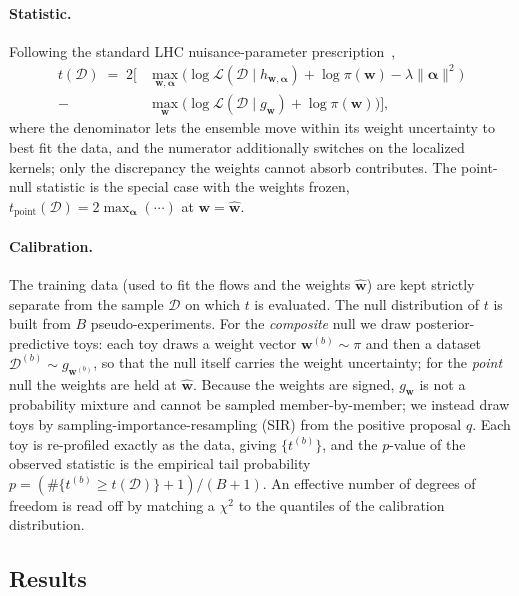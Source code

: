 \paragraph{Statistic.}
Following the standard LHC nuisance-parameter prescription~\citep{Cowan:2010js},
\begin{equation}\label{eq:app-lrt}
\begin{aligned}
  t(\mathcal D) \;=\; 2\Big[
    &\max_{\boldsymbol w,\boldsymbol\alpha}
      \Big(\log\mathcal L(\mathcal D\mid h_{\boldsymbol w,\boldsymbol\alpha})
           + \log\pi(\boldsymbol w) - \lambda\|\boldsymbol\alpha\|^2\Big) \\
    -\; &\max_{\boldsymbol w}
      \Big(\log\mathcal L(\mathcal D\mid g_{\boldsymbol w})
           + \log\pi(\boldsymbol w)\Big)
  \Big] ,
\end{aligned}
\end{equation}
where the denominator lets the ensemble move within its weight uncertainty to
best fit the data, and the numerator additionally switches on the localized
kernels; only the discrepancy the weights cannot absorb contributes. The
point-null statistic is the special case with the weights frozen,
$t_{\mathrm{point}}(\mathcal D)=2\max_{\boldsymbol\alpha}(\cdots)$ at
$\boldsymbol w=\hat{\boldsymbol w}$.

\paragraph{Calibration.}
The training data (used to fit the flows and the weights $\hat{\boldsymbol w}$)
are kept strictly separate from the sample $\mathcal D$ on which $t$ is evaluated.
The null distribution of $t$ is built from $B$ pseudo-experiments. For the
\emph{composite} null we draw posterior-predictive toys: each toy draws a weight
vector $\boldsymbol w^{(b)}\sim\pi$ and then a dataset
$\mathcal D^{(b)}\sim g_{\boldsymbol w^{(b)}}$, so that the null itself carries the
weight uncertainty; for the \emph{point} null the weights are held at
$\hat{\boldsymbol w}$. Because the weights are signed, $g_{\boldsymbol w}$ is not a
probability mixture and cannot be sampled member-by-member; we instead draw toys
by sampling-importance-resampling (SIR) from the positive proposal $q$. Each toy
is re-profiled exactly as the data, giving $\{t^{(b)}\}$, and the $p$-value of the
observed statistic is the empirical tail probability
$p=(\#\{t^{(b)}\ge t(\mathcal D)\}+1)/(B+1)$. An effective number of degrees of
freedom is read off by matching a $\chi^2$ to the quantiles of the calibration
distribution.

\subsection{Results}
\label{app:nf-results}
